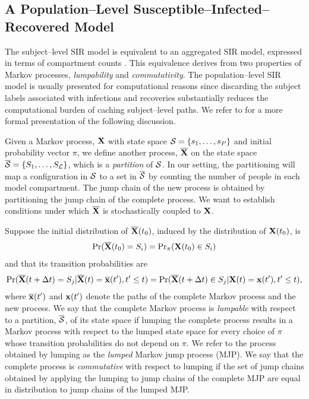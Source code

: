 \subsection{A Population--Level Susceptible--Infected--Recovered Model}
\label{subsec:sir_population_mod}
The subject--level SIR model is equivalent to an aggregated SIR model, expressed in terms of compartment counts \cite{allen2008introduction, andersson2000stochastic}. This equivalence derives from two properties of Markov processes, \textit{lumpability} and \textit{commutativity}. The population--level SIR model is usually presented for computational reasons since discarding the subject labels associated with infections and recoveries substantially reduces the computational burden of caching subject--level paths. We refer to \cite{tian2006lumpability} for a more formal presentation of the following discussion. 

Given a Markov process, $ \mathbf{X} $ with state space $ \mathcal{S} = \lbrace s_1,\dots,s_P\rbrace $ and initial probability vector $ \pi $, we define another process, $ \overline{\mathbf{X}} $ on the state space $ \overline{\mathcal{S}} = \lbrace S_1,\dots,S_\mathcal{L}\rbrace $, which is a \textit{partition} of $ \mathcal{S} $. In our setting, the partitioning will map a configuration in $ \mathcal{S} $ to a set in $ \overline{\mathcal{S}} $ by counting the number of people in each model compartment. The jump chain of the new process is obtained by partitioning the jump chain of the complete process. We want to establish conditions under which $ \overline{\mathbf{X}} $ is stochastically coupled to $ \mathbf{X} $. 

Suppose the initial distribution of $ \overline{\mathbf{X}}(t_0) $, induced by the distribution of $ \mathbf{X}(t_0) $, is \begin{equation*}
\Pr(\overline{\mathbf{X}}(t_0) = S_i) = \mathrm{Pr}_\pi(\mathbf{X}(t_0) \in S_i)
\end{equation*}
and that its transition probabilities are
\begin{equation*}
\Pr(\overline{\mathbf{X}}(t+\Delta t) = S_j | \overline{\mathbf{X}}(t)=\overline{\mathbf{x}}(t^\prime), t^\prime \leq t) = \Pr(\overline{\mathbf{X}}(t+\Delta t) \in S_j | \mathbf{X}(t)=\mathbf{x}(t^\prime), t^\prime \leq t),
\end{equation*}
where $ \overline{\mathbf{x}}(t^\prime) $  and $ \mathbf{x}(t^\prime) $ denote the paths of the complete Markov process and the new process. We say that the complete Markov process is \textit{lumpable} with respect to a partition, $ \overline{\mathcal{S}} $, of its state space if lumping the complete process results in a Markov process with respect to the lumped state space for every choice of $ \pi $ whose transition probabilities do not depend on $ \pi $. We refer to the process obtained by lumping as the \textit{lumped} Markov jump process (MJP). We say that the complete process is \textit{commutative} with respect to lumping if the set of jump chains obtained by applying the lumping to jump chains of the complete MJP are equal in distribution to jump chains of the lumped MJP.

